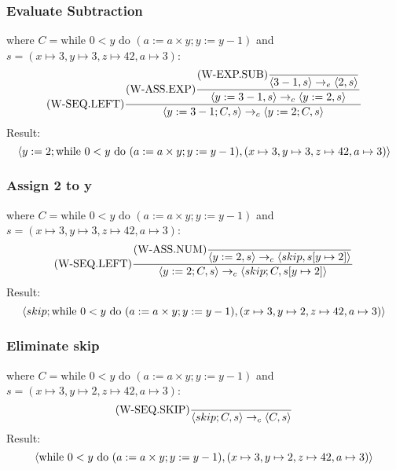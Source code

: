 \documentclass{report}
\begin{document}
\subsubsection*{Evaluate Subtraction}
where $C = \text{while } 0<y \text{ do } (a:= a \times y; y:= y - 1)$ and $s = (x \mapsto 3, y \mapsto 3, z \mapsto 42, a \mapsto 3)$:
\[\text{(W-SEQ.LEFT)}\dfrac{
		\text{(W-ASS.EXP)}\dfrac{
			\text{(W-EXP.SUB)}\dfrac{}{\langle 3 - 1, s \rangle \to_e \langle 2, s \rangle}
		}{\langle y := 3 - 1, s \rangle \to_c \langle y := 2, s \rangle}
	}{\langle y := 3 - 1;C, s \rangle \to_c \langle y:= 2;C, s \rangle}\]
Result:
\[\langle y:= 2;  \text{while } 0<y \text{ do } (a:= a \times y; y:= y - 1), (x \mapsto 3, y \mapsto 3, z \mapsto 42, a \mapsto 3) \rangle\]
\subsubsection*{Assign 2 to y}
where $C = \text{while } 0<y \text{ do } (a:= a \times y; y:= y - 1)$ and $s = (x \mapsto 3, y \mapsto 3, z \mapsto 42, a \mapsto 3)$:
\[\text{(W-SEQ.LEFT)}\dfrac{
		\text{(W-ASS.NUM)}\dfrac{}{\langle y:= 2, s \rangle \to_c \langle skip, s[y \mapsto 2] \rangle}
	}{\langle y:= 2;C, s \rangle \to_c \langle skip;C, s[y \mapsto 2] \rangle}\]
Result:
\[\langle skip;\text{while } 0<y \text{ do } (a:= a \times y; y:= y - 1), (x \mapsto 3, y \mapsto 2, z \mapsto 42, a \mapsto 3) \rangle\]
\subsubsection*{Eliminate skip}
where $C = \text{while } 0<y \text{ do } (a:= a \times y; y:= y - 1)$ and $s = (x \mapsto 3, y \mapsto 2, z \mapsto 42, a \mapsto 3)$:
\[\text{(W-SEQ.SKIP)}\dfrac{}{\langle skip;C, s \rangle \to_c \langle C, s \rangle}\]
Result:
\[\langle \text{while } 0<y \text{ do } (a:= a \times y; y:= y - 1), (x \mapsto 3, y \mapsto 2, z \mapsto 42, a \mapsto 3) \rangle\]
\end{document}
